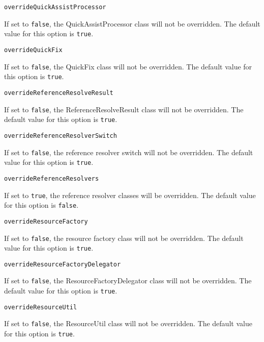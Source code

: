 \noindent\texttt{overrideQuickAssistProcessor}
\begin{myindentpar}{1cm}
If set to \texttt{false}, the QuickAssistProcessor class will not be overridden. The default value for this option is \texttt{true}.
\end{myindentpar}

\noindent\texttt{overrideQuickFix}
\begin{myindentpar}{1cm}
If set to \texttt{false}, the QuickFix class will not be overridden. The default value for this option is \texttt{true}.
\end{myindentpar}

\noindent\texttt{overrideReferenceResolveResult}
\begin{myindentpar}{1cm}
If set to \texttt{false}, the ReferenceResolveResult class will not be overridden. The default value for this option is \texttt{true}.
\end{myindentpar}

\noindent\texttt{overrideReferenceResolverSwitch}
\begin{myindentpar}{1cm}
If set to \texttt{false}, the reference resolver switch will not be overridden. The default value for this option is \texttt{true}.
\end{myindentpar}

\noindent\texttt{overrideReferenceResolvers}
\begin{myindentpar}{1cm}
If set to \texttt{true}, the reference resolver classes will be overridden. The default value for this option is \texttt{false}.
\end{myindentpar}

\noindent\texttt{overrideResourceFactory}
\begin{myindentpar}{1cm}
If set to \texttt{false}, the resource factory class will not be overridden. The default value for this option is \texttt{true}.
\end{myindentpar}

\noindent\texttt{overrideResourceFactoryDelegator}
\begin{myindentpar}{1cm}
If set to \texttt{false}, the ResourceFactoryDelegator class will not be overridden. The default value for this option is \texttt{true}.
\end{myindentpar}

\noindent\texttt{overrideResourceUtil}
\begin{myindentpar}{1cm}
If set to \texttt{false}, the ResourceUtil class will not be overridden. The default value for this option is \texttt{true}.
\end{myindentpar}

